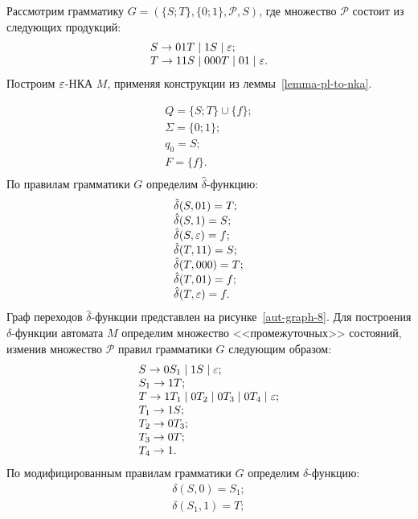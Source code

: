 \begin{myexample}
\label{ex-pl-to-nka}
	Рассмотрим грамматику $G = (\{S; T\}, \{0; 1\}, \mathcal P, S)$, где множество $\mathcal P$ состоит из следующих продукций:
	\[
		\begin{array}{l}
			S \to 01T \mid 1S \mid \varepsilon; \\
			T \to 11S \mid 000T \mid 01 \mid \varepsilon.
		\end{array}
	\]
Построим $\varepsilon$-НКА $M$, применяя конструкции из леммы~\ref{lemma-pl-to-nka}.
	
\[
		\begin{array}{l}
			Q = \{ S; T \} \cup \{ f \}; \\
			\Sigma = \{ 0; 1 \}; \\
			q_0 = S;\\
			F = \{ f \}.\\
		\end{array}
\]
		По правилам грамматики $G$ определим $\hat{\delta}$-функцию:
		\[
			\begin{array}{l}
				\hat{\delta}(S, 01) = T; \\
				\hat{\delta}(S, 1) = S; \\
				\hat{\delta}(S, \varepsilon) = f; \\
				\hat{\delta}(T, 11) = S; \\
				\hat{\delta}(T, 000) = T; \\
				\hat{\delta}(T, 01) = f; \\
				\hat{\delta}(T, \varepsilon) = f.
		\end{array}
	\]
	Граф переходов $\hat{\delta}$-функции представлен на рисунке~\ref{aut-graph-8}.
	Для построения $\delta$-функции автомата $M$ определим множество <<промежуточных>> состояний, изменив множество $\mathcal P$ правил грамматики $G$ следующим образом:
	\[
			\begin{array}{l}
				S \to 0S_1 \mid 1S \mid \varepsilon; \\
				S_1 \to 1T; \\
				T \to 1T_1 \mid 0T_2 \mid 0T_3 \mid 0T_4 \mid \varepsilon; \\
				T_1 \to 1S; \\
				T_2 \to 0T_3; \\
				T_3 \to 0T; \\
				T_4 \to 1.
			\end{array}
	\]
	По модифицированным правилам грамматики $G$ определим ${\delta}$-функцию:
	\[
			\begin{array}{l}
				\delta(S, 0) = S_1; \\
				\delta(S_1, 1) = T; \\

\end{array}\]
\end{myexample}
